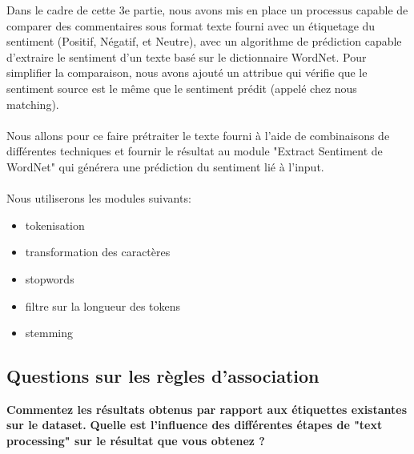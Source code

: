 \documentclass[a4paper]{article}
\begin{document}
Dans le cadre de cette 3e partie, nous avons mis en place un processus capable de comparer des commentaires sous format texte fourni avec un étiquetage du sentiment (Positif, Négatif, et Neutre), avec un algorithme de prédiction capable d'extraire le sentiment d'un texte basé sur le dictionnaire WordNet. Pour simplifier la comparaison, nous avons ajouté un attribue qui vérifie que le sentiment source est le même que le sentiment prédit (appelé chez nous matching).
\\\\
Nous allons pour ce faire prétraiter le texte fourni à l'aide de combinaisons de différentes techniques et fournir le résultat au module "Extract Sentiment de WordNet" qui générera une prédiction du sentiment lié à l'input.
\\\\
Nous utiliserons les modules suivants:
\begin{itemize}
	\item tokenisation
	\item transformation des caractères
	\item stopwords
	\item filtre sur la longueur des tokens
	\item stemming
\end{itemize}

\subsection{Questions sur les règles d'association}

\textbf{Commentez les résultats obtenus par rapport aux étiquettes existantes sur le dataset.}
\textbf{Quelle est l'influence des différentes étapes de "text processing" sur le résultat que vous obtenez ?}
\end{document}

